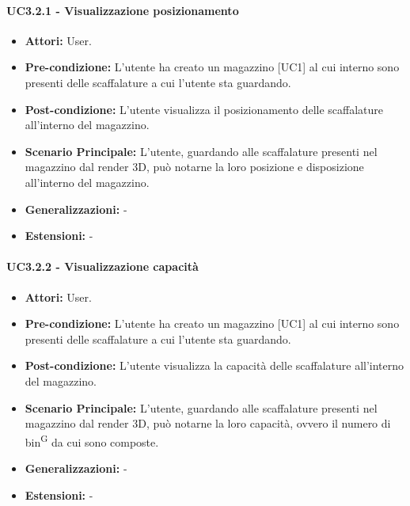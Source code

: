 \paragraph{UC3.2.1 - Visualizzazione posizionamento}
\begin{itemize}
    \item \textbf{Attori:} User.
    \item \textbf{Pre-condizione:} L'utente ha creato un magazzino [UC1] al cui interno sono presenti delle scaffalature a cui l'utente sta guardando.
    \item \textbf{Post-condizione:} L'utente visualizza il posizionamento delle scaffalature all'interno del magazzino.
    \item \textbf{Scenario Principale:} L'utente, guardando alle scaffalature presenti nel magazzino dal render 3D, può notarne la loro posizione e disposizione all'interno del magazzino.
    \item \textbf{Generalizzazioni:} -
    \item \textbf{Estensioni:} -
\end{itemize}


\paragraph{UC3.2.2 - Visualizzazione capacità}
\begin{itemize}
    \item \textbf{Attori:} User.
    \item \textbf{Pre-condizione:} L'utente ha creato un magazzino [UC1] al cui interno sono presenti delle scaffalature a cui l'utente sta guardando.
    \item \textbf{Post-condizione:} L'utente visualizza la capacità delle scaffalature all'interno del magazzino.
    \item \textbf{Scenario Principale:}  L'utente, guardando alle scaffalature presenti nel magazzino dal render 3D, può notarne la loro capacità, ovvero il numero di bin\textsuperscript{G} da cui sono composte.
    \item \textbf{Generalizzazioni:} -
    \item \textbf{Estensioni:} -
\end{itemize}


